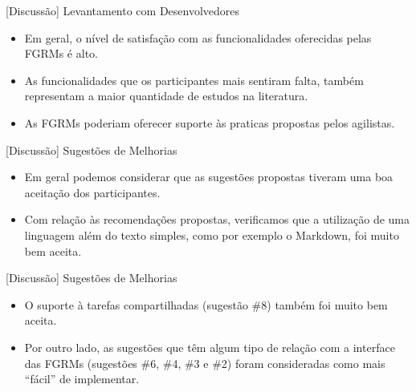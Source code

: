 \documentclass[t,14pt,mathserif]{beamer}
\begin{document}
\begin{frame}{[Discussão] Levantamento com Desenvolvedores}
    \begin{itemize}
        \item Em geral, o nível de satisfação com as funcionalidades oferecidas
            pelas FGRMs é alto.

        \item As funcionalidades que os
            participantes mais sentiram falta, também representam a maior
            quantidade de estudos na literatura.

        \item As FGRMs poderiam oferecer suporte às praticas propostas pelos
            agilistas.

    \end{itemize}
\end{frame}

\begin{frame}{[Discussão] Sugestões de Melhorias}
    \begin{itemize}

        \item Em geral podemos considerar que as sugestões propostas tiveram uma
            boa aceitação dos participantes.

        \item Com relação às recomendações propostas, verificamos que a
            utilização de uma linguagem além do texto simples, como por exemplo
            o Markdown, foi muito bem aceita.

    \end{itemize}
\end{frame}

\begin{frame}{[Discussão] Sugestões de Melhorias}
    \begin{itemize}

        \item O suporte à tarefas compartilhadas (sugestão \#8) também foi muito
            bem aceita.

        \item Por outro lado, as sugestões que têm algum tipo de relação com a
              interface das FGRMs (sugestões \#6, \#4, \#3 e \#2) foram
              consideradas como mais ``fácil'' de implementar.

    \end{itemize}
\end{frame}
\end{document}
